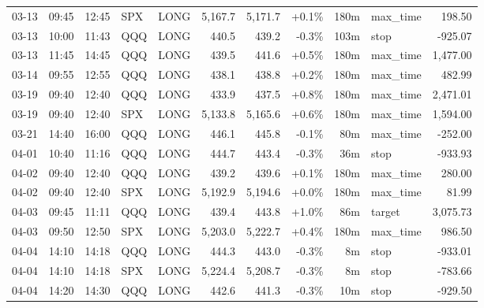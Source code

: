\documentclass[11pt,a4paper,twoside]{article}
\begin{document}
\begin{center}
\begin{longtable}{>{\color{txtmain}}l l l l l r r r r >{\color{txtmain}}l r}
03-13 & 09:45 & 12:45 & SPX & LONG & 5,167.7 & 5,171.7 & \textcolor{wingreen}{+0.1\%} & 180m & max\_time & \textcolor{wingreen}{198.50} \\
03-13 & 10:00 & 11:43 & QQQ & LONG & 440.5 & 439.2 & \textcolor{lossred}{-0.3\%} & 103m & stop & \textcolor{lossred}{-925.07} \\
03-13 & 11:45 & 14:45 & QQQ & LONG & 439.5 & 441.6 & \textcolor{wingreen}{+0.5\%} & 180m & max\_time & \textcolor{wingreen}{1,477.00} \\
03-14 & 09:55 & 12:55 & QQQ & LONG & 438.1 & 438.8 & \textcolor{wingreen}{+0.2\%} & 180m & max\_time & \textcolor{wingreen}{482.99} \\
03-19 & 09:40 & 12:40 & QQQ & LONG & 433.9 & 437.5 & \textcolor{wingreen}{+0.8\%} & 180m & max\_time & \textcolor{wingreen}{2,471.01} \\
03-19 & 09:40 & 12:40 & SPX & LONG & 5,133.8 & 5,165.6 & \textcolor{wingreen}{+0.6\%} & 180m & max\_time & \textcolor{wingreen}{1,594.00} \\
03-21 & 14:40 & 16:00 & QQQ & LONG & 446.1 & 445.8 & \textcolor{lossred}{-0.1\%} & 80m & max\_time & \textcolor{lossred}{-252.00} \\
04-01 & 10:40 & 11:16 & QQQ & LONG & 444.7 & 443.4 & \textcolor{lossred}{-0.3\%} & 36m & stop & \textcolor{lossred}{-933.93} \\
04-02 & 09:40 & 12:40 & QQQ & LONG & 439.2 & 439.6 & \textcolor{wingreen}{+0.1\%} & 180m & max\_time & \textcolor{wingreen}{280.00} \\
04-02 & 09:40 & 12:40 & SPX & LONG & 5,192.9 & 5,194.6 & \textcolor{wingreen}{+0.0\%} & 180m & max\_time & \textcolor{wingreen}{81.99} \\
04-03 & 09:45 & 11:11 & QQQ & LONG & 439.4 & 443.8 & \textcolor{wingreen}{+1.0\%} & 86m & target & \textcolor{wingreen}{3,075.73} \\
04-03 & 09:50 & 12:50 & SPX & LONG & 5,203.0 & 5,222.7 & \textcolor{wingreen}{+0.4\%} & 180m & max\_time & \textcolor{wingreen}{986.50} \\
04-04 & 14:10 & 14:18 & QQQ & LONG & 444.3 & 443.0 & \textcolor{lossred}{-0.3\%} & 8m & stop & \textcolor{lossred}{-933.01} \\
04-04 & 14:10 & 14:18 & SPX & LONG & 5,224.4 & 5,208.7 & \textcolor{lossred}{-0.3\%} & 8m & stop & \textcolor{lossred}{-783.66} \\
04-04 & 14:20 & 14:30 & QQQ & LONG & 442.6 & 441.3 & \textcolor{lossred}{-0.3\%} & 10m & stop & \textcolor{lossred}{-929.50} \\

\end{longtable}
\end{center}
\end{document}
